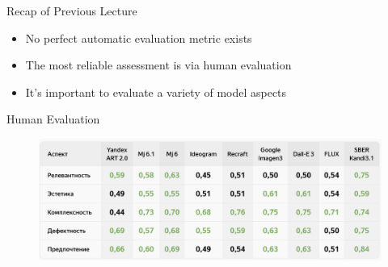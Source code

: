 \documentclass{beamer}
\begin{document}
\begin{frame}{Recap of Previous Lecture}
	\begin{itemize}
		\item No perfect automatic evaluation metric exists
		\item The most reliable assessment is via human evaluation
		\item It's important to evaluate a variety of model aspects
	\end{itemize}
	\begin{block}{Human Evaluation}
		\begin{figure}
			\includegraphics[width=1.0\linewidth]{figs/yaart_2.5}
		\end{figure}
	\end{block}
\end{frame}
\end{document}
